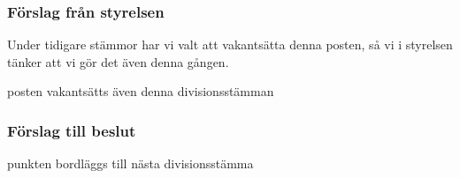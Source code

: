 \documentclass[protokoll]{dvd}
\begin{document}
\subsubsection*{Förslag från styrelsen}
Under tidigare stämmor har vi valt att vakantsätta denna posten, så vi i styrelsen tänker
att vi gör det även denna gången.

\begin{attsatser}
    \item posten vakantsätts även denna divisionsstämman
\end{attsatser}

\subsubsection*{Förslag till beslut}

\begin{attsatser}
    \item punkten bordläggs till nästa divisionsstämma
\end{attsatser}




\end{document}
